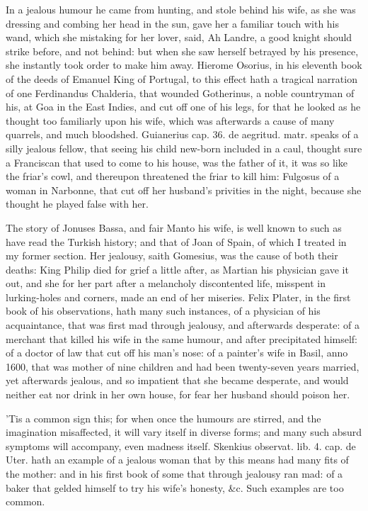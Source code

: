 {In a jealous humour he came from hunting, and stole behind his wife, as
she was dressing and combing her head in the sun, gave her a familiar
touch with his wand, which she mistaking for her lover, said, Ah
Landre, a good knight should strike before, and not behind: but when
she saw herself betrayed by his presence, she instantly took order to
make him away. Hierome Osorius, in his eleventh book of the deeds of
Emanuel King of Portugal, to this effect hath a tragical narration of
one Ferdinandus Chalderia, that wounded Gotherinus, a noble countryman
of his, at Goa in the East Indies, and cut off one of his legs,
for that he looked as he thought too familiarly upon his wife, which
was afterwards a cause of many quarrels, and much bloodshed. Guianerius
cap. 36. de aegritud. matr. speaks of a silly jealous fellow, that
seeing his child new-born included in a caul, thought sure a
Franciscan that used to come to his house, was the father of it,
it was so like the friar's cowl, and thereupon threatened the friar to
kill him: Fulgosus of a woman in Narbonne, that cut off her husband's
privities in the night, because she thought he played false with her.

The story of Jonuses Bassa, and fair Manto his wife, is well known to
such as have read the Turkish history; and that of Joan of Spain, of
which I treated in my former section. Her jealousy, saith Gomesius, was
the cause of both their deaths: King Philip died for grief a little
after, as Martian his physician gave it out, and she for her part
after a melancholy discontented life, misspent in lurking-holes and
corners, made an end of her miseries. Felix Plater, in the first book
of his observations, hath many such instances, of a physician of his
acquaintance, that was first mad through jealousy, and afterwards
desperate: of a merchant that killed his wife in the same humour,
and after precipitated himself: of a doctor of law that cut off his
man's nose: of a painter's wife in Basil, anno 1600, that was mother of
nine children and had been twenty-seven years married, yet afterwards
jealous, and so impatient that she became desperate, and would neither
eat nor drink in her own house, for fear her husband should poison her.

'Tis a common sign this; for when once the humours are stirred, and the
imagination misaffected, it will vary itself in diverse forms; and many
such absurd symptoms will accompany, even madness itself. Skenkius
observat. lib. 4. cap. de Uter. hath an example of a jealous woman that
by this means had many fits of the mother: and in his first book of
some that through jealousy ran mad: of a baker that gelded himself to
try his wife's honesty, \&c. Such examples are too common.

}
